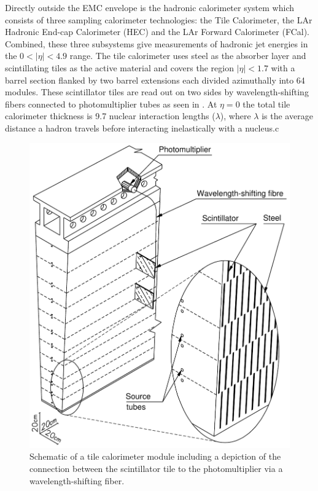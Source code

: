 Directly outside the EMC envelope is the hadronic calorimeter system
\cite{PERF-2007-01} which consists of three sampling calorimeter technologies:
the Tile Calorimeter, the LAr Hadronic End-cap Calorimeter (HEC) and the LAr
Forward Calorimeter (FCal).  Combined, these three subsystems give measurements
of hadronic jet energies in the $0 <|\eta| < 4.9$ range. The tile calorimeter
uses steel as the absorber layer and scintillating tiles as the active material
and covers the region $|\eta| < 1.7$ with a barrel section flanked by two barrel
extensions each divided azimuthally into 64 modules.  These scintillator tiles
are read out on two sides by wavelength-shifting fibers connected to
photomultiplier tubes as seen in . At $\eta =
0$ the total tile calorimeter thickness is 9.7 nuclear interaction lengths
($\lambda$), where $\lambda$ is the average distance a hadron travels before
interacting inelastically with a nucleus.c
\begin{figure}[!htbp]
  \begin{center}
    \includegraphics[width=0.8\linewidth]{figures/atlas/tile_calorimeter.pdf}
    \caption{ \cite{PERF-2007-01} Schematic of a tile calorimeter module
including a depiction of the connection between the scintillator tile to the
photomultiplier via a wavelength-shifting fiber.}
    \label{fig:tile_calorimeter}
  \end{center}
\end{figure}

